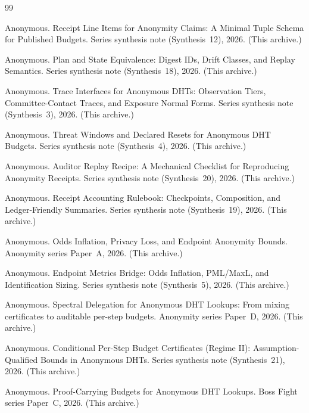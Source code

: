 \documentclass[11pt]{article}
\begin{document}
\begin{thebibliography}{99}\small

Anonymous.
\newblock Receipt Line Items for Anonymity Claims: A Minimal Tuple Schema for Published Budgets.
\newblock Series synthesis note (Synthesis~12), 2026. (This archive.)

Anonymous.
\newblock Plan and State Equivalence: Digest IDs, Drift Classes, and Replay Semantics.
\newblock Series synthesis note (Synthesis~18), 2026. (This archive.)

Anonymous.
\newblock Trace Interfaces for Anonymous DHTs: Observation Tiers, Committee-Contact Traces, and Exposure Normal Forms.
\newblock Series synthesis note (Synthesis~3), 2026. (This archive.)

Anonymous.
\newblock Threat Windows and Declared Resets for Anonymous DHT Budgets.
\newblock Series synthesis note (Synthesis~4), 2026. (This archive.)

Anonymous.
\newblock Auditor Replay Recipe: A Mechanical Checklist for Reproducing Anonymity Receipts.
\newblock Series synthesis note (Synthesis~20), 2026. (This archive.)

Anonymous.
\newblock Receipt Accounting Rulebook: Checkpoints, Composition, and Ledger-Friendly Summaries.
\newblock Series synthesis note (Synthesis~19), 2026. (This archive.)

Anonymous.
\newblock Odds Inflation, Privacy Loss, and Endpoint Anonymity Bounds.
\newblock Anonymity series Paper~A, 2026. (This archive.)

Anonymous.
\newblock Endpoint Metrics Bridge: Odds Inflation, PML/MaxL, and Identification Sizing.
\newblock Series synthesis note (Synthesis~5), 2026. (This archive.)

Anonymous.
\newblock Spectral Delegation for Anonymous DHT Lookups: From mixing certificates to auditable per-step budgets.
\newblock Anonymity series Paper~D, 2026. (This archive.)

Anonymous.
\newblock Conditional Per-Step Budget Certificates (Regime II): Assumption-Qualified Bounds in Anonymous DHTs.
\newblock Series synthesis note (Synthesis~21), 2026. (This archive.)

Anonymous.
\newblock Proof-Carrying Budgets for Anonymous DHT Lookups.
\newblock Boss Fight series Paper~C, 2026. (This archive.)


\end{thebibliography}
\end{document}
